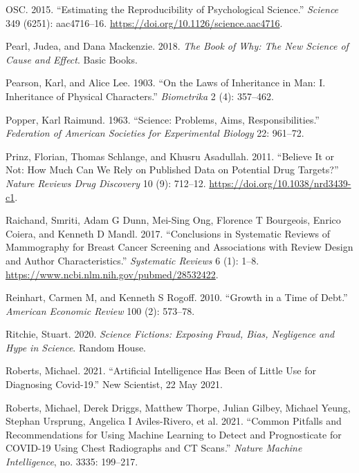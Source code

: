 \documentclass[
  10pt,
  b5paper]{book}
\newlength{\cslhangindent}
\newlength{\cslentryspacingunit} %
\newenvironment{CSLReferences}[2] %
 {%
  \setlength{\parindent}{0pt}
  \ifodd #1
  \let\oldpar\par
  \def\par{\hangindent=\cslhangindent\oldpar}
  \fi
  \setlength{\parskip}{#2\cslentryspacingunit}
 }%
 {}
\begin{document}
\begin{CSLReferences}{1}{0}
\leavevmode{}%
OSC. 2015. {``Estimating the Reproducibility of Psychological Science.''} \emph{Science} 349 (6251): aac4716--16. \url{https://doi.org/10.1126/science.aac4716}.

\leavevmode{}%
Pearl, Judea, and Dana Mackenzie. 2018. \emph{The Book of Why: The New Science of Cause and Effect}. Basic Books.

\leavevmode{}%
Pearson, Karl, and Alice Lee. 1903. {``On the Laws of Inheritance in Man: I. Inheritance of Physical Characters.''} \emph{Biometrika} 2 (4): 357--462.

\leavevmode{}%
Popper, Karl Raimund. 1963. {``Science: Problems, Aims, Responsibilities.''} \emph{Federation of American Societies for Experimental Biology} 22: 961--72.

\leavevmode{}%
Prinz, Florian, Thomas Schlange, and Khusru Asadullah. 2011. {``Believe It or Not: How Much Can We Rely on Published Data on Potential Drug Targets?''} \emph{Nature Reviews Drug Discovery} 10 (9): 712--12. \url{https://doi.org/10.1038/nrd3439-c1}.

\leavevmode{}%
Raichand, Smriti, Adam G Dunn, Mei-Sing Ong, Florence T Bourgeois, Enrico Coiera, and Kenneth D Mandl. 2017. {``Conclusions in Systematic Reviews of Mammography for Breast Cancer Screening and Associations with Review Design and Author Characteristics.''} \emph{Systematic Reviews} 6 (1): 1--8. \url{https://www.ncbi.nlm.nih.gov/pubmed/28532422}.

\leavevmode{}%
Reinhart, Carmen M, and Kenneth S Rogoff. 2010. {``Growth in a Time of Debt.''} \emph{American Economic Review} 100 (2): 573--78.

\leavevmode{}%
Ritchie, Stuart. 2020. \emph{Science Fictions: Exposing Fraud, Bias, Negligence and Hype in Science}. Random House.

\leavevmode{}%
Roberts, Michael. 2021. {``Artificial Intelligence Has Been of Little Use for Diagnosing Covid-19.''} New Scientist, 22 May 2021.

\leavevmode{}%
Roberts, Michael, Derek Driggs, Matthew Thorpe, Julian Gilbey, Michael Yeung, Stephan Ursprung, Angelica I Aviles-Rivero, et al. 2021. {``Common Pitfalls and Recommendations for Using Machine Learning to Detect and Prognosticate for COVID-19 Using Chest Radiographs and CT Scans.''} \emph{Nature Machine Intelligence}, no. 3335: 199--217.


\end{CSLReferences}
\end{document}
